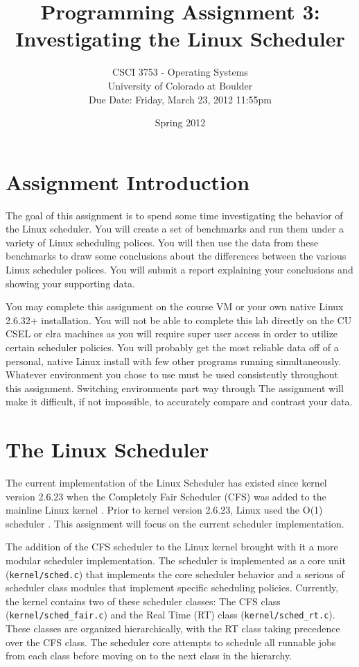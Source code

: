 \documentclass[12pt]{article}
\title{Programming Assignment 3:\\Investigating the Linux Scheduler}
\author{
  CSCI 3753 - Operating Systems\\
  University of Colorado at Boulder\\
  Due Date:  Friday, March 23, 2012 11:55pm
}
\date{Spring 2012}
\begin{document}
\maketitle

\section{Assignment Introduction}

The goal of this assignment is to spend some time investigating the
behavior of the Linux scheduler. You will create a set of benchmarks
and run them under a variety of Linux scheduling polices. You will
then use the data from these benchmarks to draw some conclusions about
the differences between the various Linux scheduler polices. You will
submit a report explaining your conclusions and showing your
supporting data.

You may complete this assignment on the course VM or your own native
Linux 2.6.32+ installation. You will not be able to complete this lab
directly on the CU CSEL or elra machines as you will require super
user access in order to utilize certain scheduler policies.
You will probably get the most reliable data off of a personal, native
Linux install with few other programs running simultaneously. Whatever
environment you chose to use must be used consistently throughout this
assignment. Switching environments part way through The assignment
will make it difficult, if not impossible, to accurately compare and
contrast your data.

\section{The Linux Scheduler}

The current implementation of the Linux
Scheduler has existed since kernel version 2.6.23 when the Completely
Fair Scheduler (CFS) was added to the mainline Linux kernel
\cite{Molnar-CFS,Jones-InsideCFS,Kumar-MultiCFS}. Prior to kernel
version 2.6.23, Linux used the O(1) scheduler \cite{Le-StudyLKS}.
This assignment will focus on the current scheduler implementation.

The addition of the CFS scheduler to the Linux kernel brought with it
a more modular scheduler implementation. The scheduler is implemented as
a core unit (\texttt{kernel/sched.c}) that implements the core
scheduler behavior and a serious of scheduler class modules that
implement specific scheduling policies. Currently, the kernel contains
two of these scheduler classes: The CFS class
(\texttt{kernel/sched\_fair.c}) and the Real Time (RT) class
(\texttt{kernel/sched\_rt.c}). These classes are
organized hierarchically,
with the RT class taking precedence over the CFS class. The scheduler
core attempts to schedule all runnable jobs from each class before
moving on to the next class in the hierarchy.
\end{document}
